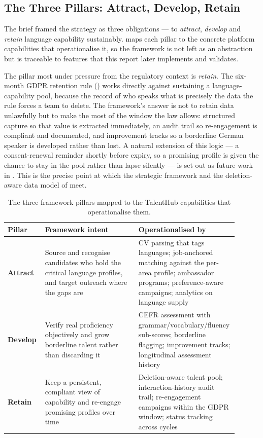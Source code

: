 \subsection{The Three Pillars: Attract, Develop, Retain}
\label{sec:framework-pillars}

The brief framed the strategy as three obligations --- to \emph{attract},
\emph{develop} and \emph{retain} language capability sustainably.
 maps each pillar to the concrete platform
capabilities that operationalise it, so the framework is not left as an
abstraction but is traceable to features that this report later implements
and validates.

The pillar most under pressure from the regulatory context is \emph{retain}.
The six-month GDPR retention rule () works directly
against sustaining a language-capability pool, because the record of who
speaks what is precisely the data the rule forces a team to delete. The framework's answer is not to retain data unlawfully but to make
the most of the window the law allows: structured capture so that value is
extracted immediately, an audit trail so re-engagement is compliant and
documented, and improvement tracks so a borderline German speaker is
developed rather than lost. A natural extension of this logic --- a
consent-renewal reminder shortly before expiry, so a promising profile is
given the chance to stay in the pool rather than lapse silently --- is set out
as future work in . This is the
precise point at which the strategic
framework and the deletion-aware data model of 
meet.

\begin{table}[H]
\centering
\caption[Language talent framework pillars mapped to platform capabilities]{The
three framework pillars mapped to the TalentHub capabilities that
operationalise them.}
\label{tab:framework-pillars}
\small
\begin{tabular}{p{0.16\linewidth}p{0.40\linewidth}p{0.34\linewidth}}
\toprule
\textbf{Pillar} & \textbf{Framework intent} & \textbf{Operationalised by} \\
\midrule
\textbf{Attract} & Source and recognise candidates who hold the critical language profiles, and target outreach where the gaps are & CV parsing that tags languages; job-anchored matching against the per-area profile; ambassador programs; preference-aware campaigns; analytics on language supply \\
\textbf{Develop} & Verify real proficiency objectively and grow borderline talent rather than discarding it & CEFR assessment with grammar/vocabulary/fluency sub-scores; borderline flagging; improvement tracks; longitudinal assessment history \\
\textbf{Retain} & Keep a persistent, compliant view of capability and re-engage promising profiles over time & Deletion-aware talent pool; interaction-history audit trail; re-engagement campaigns within the GDPR window; status tracking across cycles \\
\bottomrule
\end{tabular}
\end{table}

